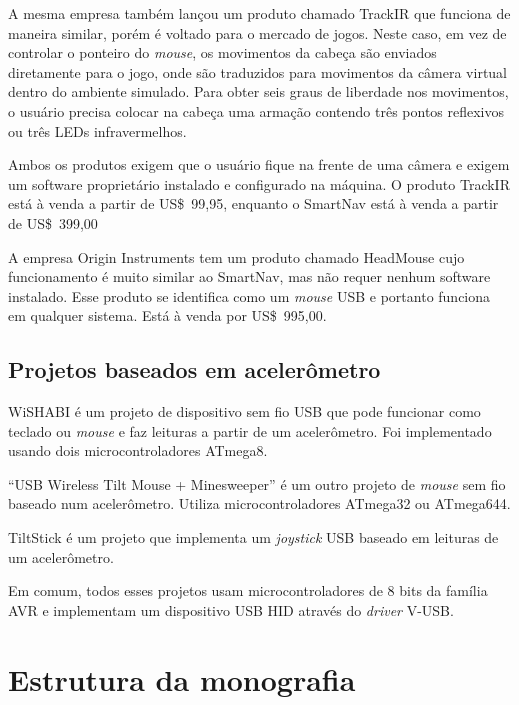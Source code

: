 \documentclass[brazil,pagestart=firstchapter]{abnt}
\begin{document}
A mesma empresa também lançou um produto chamado TrackIR \cite{TrackIR} que
funciona de maneira similar, porém é voltado para o mercado de jogos. Neste
caso, em vez de controlar o ponteiro do \textit{mouse}, os movimentos da
cabeça são enviados diretamente para o jogo, onde são traduzidos para
movimentos da câmera virtual dentro do ambiente simulado. Para obter seis
graus de liberdade nos movimentos, o usuário precisa colocar na cabeça uma
armação contendo três pontos reflexivos ou três \acsp{LED} infravermelhos.

Ambos os produtos exigem que o usuário fique na frente de uma câmera e
exigem um software proprietário instalado e configurado na máquina. O
produto TrackIR está à venda a partir de US\$~99,95, enquanto o SmartNav
está à venda a partir de US\$~399,00

A empresa Origin Instruments tem um produto chamado HeadMouse
\cite{HeadMouse} cujo funcionamento é muito similar ao SmartNav, mas
não requer nenhum software instalado. Esse produto se identifica como um
\textit{mouse} \acs{USB} e portanto funciona em qualquer sistema. Está à
venda por US\$~995,00.


\subsection{Projetos baseados em acelerômetro}
\label{sub:acelerometro}

WiSHABI \cite{WiSHABI} é um projeto de dispositivo sem fio \acs{USB} que
pode funcionar como teclado ou \textit{mouse} e faz leituras a partir de um
acelerômetro. Foi implementado usando dois microcontroladores ATmega8.

``USB Wireless Tilt Mouse + Minesweeper'' \cite{USBWirelessTiltMouse} é um
outro projeto de \textit{mouse} sem fio baseado num acelerômetro. Utiliza
microcontroladores ATmega32 ou ATmega644.

TiltStick \cite{TiltStick} é um projeto que implementa um \textit{joystick}
\acs{USB} baseado em leituras de um acelerômetro.

Em comum, todos esses projetos usam microcontroladores de 8 bits da família
AVR e implementam um dispositivo \acs{USB} \acs{HID} através do
\textit{driver} V-USB.


\section{Estrutura da monografia}
\label{sec:estrutura_da_monografia}
\end{document}
